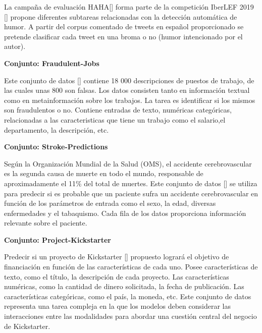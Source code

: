 \begin{annexes}
La campaña de evaluación HAHA[\cite{haha}] forma parte de la competición IberLEF 2019 [\cite{sepln-2019iberlef}] propone diferentes subtareas relacionadas con la 
detección automática de humor. A partir del corpus comentado de tweets en español proporcionado se pretende clasificar cada tweet en una broma o no (humor 
intencionado por el autor).

\begin{flushleft} 
    { \textbf{Conjunto: Fraudulent-Jobs}}\label{description:fraudulent}
\end{flushleft}

Este conjunto de datos [\cite{fraudulent-job}] contiene 18 000 descripciones de puestos de trabajo, de las cuales unas 800 son falsas. Los datos consisten tanto en información textual como en 
metainformación sobre los trabajos. La tarea es identificar si los mismos son fraudulentos o no. Contiene entradas de texto, numéricas categóricas, relacionadas a las 
caracteristicas que tiene un trabajo como el salario,el departamento, la descripción, etc. 


\begin{flushleft} 
    { \textbf{Conjunto: Stroke-Predictions}}\label{description:stroke}
\end{flushleft}

Según la Organización Mundial de la Salud (OMS), el accidente cerebrovascular es la segunda causa de muerte en todo el mundo, responsable de aproximadamente el 
11\% del total de muertes.
Este conjunto de datos [\cite{stroke-prediction}] se utiliza para predecir si es probable que un paciente sufra un accidente cerebrovascular en función de los 
parámetros de entrada como el sexo, la edad, diversas enfermedades y el tabaquismo. Cada fila de los datos proporciona información relevante sobre el paciente.

\begin{flushleft} 
    { \textbf{Conjunto: Project-Kickstarter}}\label{description:project}
\end{flushleft}

Predecir si un proyecto de Kickstarter [\cite{project-kickstarter}] propuesto logrará el objetivo de financiación en función de las características de cada uno. Posee características de texto, 
como el título, la descripción de cada proyecto. Las características numéricas, como la cantidad de dinero solicitada, la fecha de publicación. Las características 
categóricas, como el país, la moneda, etc. Este conjunto de datos representa una tarea compleja en la que los modelos deben considerar las interacciones entre las 
modalidades para abordar una cuestión central del negocio de Kickstarter.


\end{annexes}
